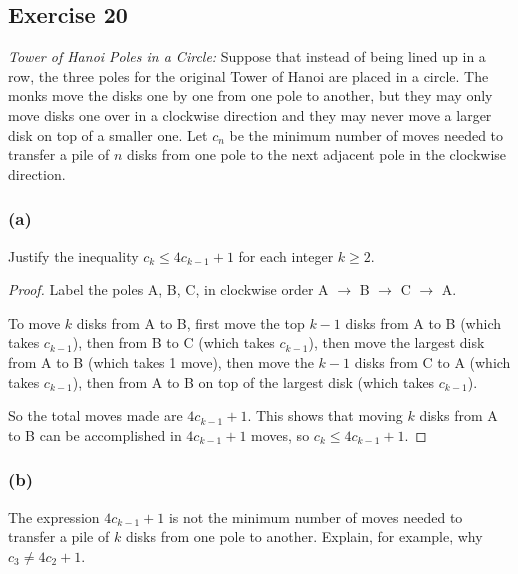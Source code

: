 \documentclass[14pt]{extarticle}
\begin{document}
\subsection{Exercise 20}
{\it Tower of Hanoi Poles in a Circle:} Suppose that instead of being lined up in a row, the three poles for the 
original Tower of Hanoi are placed in a circle. The monks move the disks one by one from one pole to another, but 
they may only move disks one over in a clockwise direction and they may never move a larger disk on top of a smaller 
one. Let $c_n$ be the minimum number of moves needed to transfer a pile of $n$ disks from one pole to the next 
adjacent pole in the clockwise direction.

\subsubsection{(a)}
Justify the inequality $c_k \leq 4c_{k - 1} + 1$ for each integer $k \geq 2$.

\begin{proof}
Label the poles A, B, C, in clockwise order A $\to$ B $\to$ C $\to$ A.

To move $k$ disks from A to B, first move the top $k-1$ disks from A to B (which takes $c_{k-1}$), then from B to C
(which takes $c_{k-1}$), then move the largest disk from A to B (which takes 1 move), then move the $k-1$ disks from C 
to A (which takes $c_{k-1}$), then from A to B on top of the largest disk (which takes $c_{k-1}$).

So the total moves made are $4c_{k-1} + 1$. This shows that moving $k$ disks from A to B can be accomplished in
$4c_{k-1} + 1$ moves, so $c_k \leq 4c_{k-1} + 1$.
\end{proof}

\subsubsection{(b)}
The expression $4c_{k - 1} + 1$ is not the minimum number of moves needed to transfer a pile of $k$ disks from one 
pole to another. Explain, for example, why $c_3 \neq 4c_2 + 1$.
\end{document}
